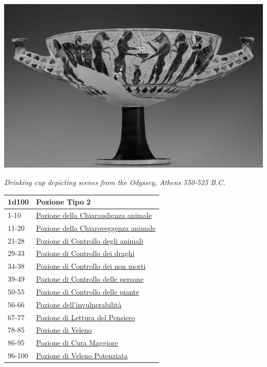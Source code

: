 \begin{multicols}{2}
{\begin{center}
\includegraphics[width=0.8\linewidth]{immagini/cupdrinking.png}

\emph{Drinking cup depicting scenes from the Odyssey, Athens 550-525 B.C.}
\end{center}
\hypertarget{Pozione Tipo 2}{}
{\small\begin{tabular}{ll}
		\toprule
\textbf{1d100} & \textbf{Pozione Tipo 2}\\
\toprule
1-10 & \hyperlink{PozionedellaChiaraudienzaanimale}{Pozione della Chiaraudienza animale}\\
11-20 & \hyperlink{PozionedellaChiaroveggenzaanimale}{Pozione della Chiaroveggenza animale}\\
21-28 & \hyperlink{PozionediControllodeglianimali}{Pozione di Controllo degli animali}\\
29-33 & \hyperlink{PozionediControllodeidraghi}{Pozione di Controllo dei draghi}\\
34-38 & \hyperlink{PozionediControllodeinonmorti}{Pozione di Controllo dei non morti}\\
39-49 & \hyperlink{PozionediControllodellepersone}{Pozione di Controllo delle persone}\\
50-55 & \hyperlink{PozionediControllodellepiante}{Pozione di Controllo delle piante}\\
56-66 & \hyperlink{Pozionedell'invulnerabilità}{Pozione dell'invulnerabilità}\\
67-77 & \hyperlink{PozionediLetturadelPensiero}{Pozione di Lettura del Pensiero}\\
78-85 & \hyperlink{PozionediVeleno}{Pozione di Veleno}\\
86-95 & \hyperlink{pozionifiltri}{Pozione di Cura Maggiore}\\
96-100 & \hyperlink{pozionifiltri}{Pozione di Veleno Potenziata}
\end{tabular}}

}
\end{multicols}
